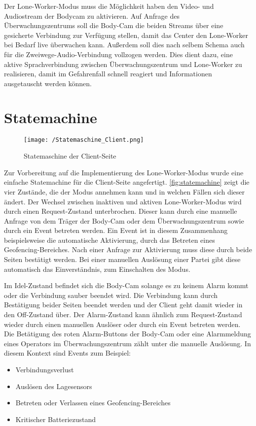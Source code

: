 \documentclass[thesis.tex]{subfiles}
\begin{document}
Der Lone-Worker-Modus muss die Möglichkeit haben den Video- und Audiostream der Bodycam zu aktivieren.
Auf Anfrage des Überwachungszentrums soll die Body-Cam die beiden Streams über eine gesicherte Verbindung zur Verfügung stellen,
damit das Center den Lone-Worker bei Bedarf live überwachen kann.
Außerdem soll dies nach selbem Schema auch für die Zweiwege-Audio-Verbindung vollzogen werden.
Dies dient dazu, eine aktive Sprachverbindung zwischen Überwachungszentrum und Lone-Worker zu realisieren, damit im Gefahrenfall schnell reagiert
und Informationen ausgetauscht werden können.

\pagebreak

\section{Statemachine}

\begin{figure}[h]
    \centering
    \texttt{[image: /Statemaschine\_Client.png]}
    \caption{Statemaschine der Client-Seite}
    \label{fig:statemachine}
\end{figure}

Zur Vorbereitung auf die Implementierung des Lone-Worker-Modus wurde eine einfache Statemachine für die Client-Seite angefertigt.
\autoref{fig:statemachine} zeigt die vier Zustände, die der Modus annehmen kann und in welchen Fällen sich dieser ändert.
Der Wechsel zwischen inaktiven und aktiven Lone-Worker-Modus wird durch einen Request-Zustand unterbrochen.
Dieser kann durch eine manuelle Anfrage von dem Träger der Body-Cam oder dem Überwachungszentrum sowie durch ein Event betreten werden.
Ein Event ist in diesem Zusammenhang beispielsweise die automatische Aktivierung, durch das Betreten eines Geofencing-Bereiches.
Nach einer Anfrage zur Aktivierung muss diese durch beide Seiten bestätigt werden.
Bei einer manuellen Auslösung einer Partei gibt diese automatisch das Einverständnis, zum Einschalten des Modus.

Im Idel-Zustand befindet sich die Body-Cam solange es zu keinem Alarm kommt oder die Verbindung sauber beendet wird.
Die Verbindung kann durch Bestätigung beider Seiten beendet werden und der Client geht damit wieder in den Off-Zustand über.
Der Alarm-Zustand kann ähnlich zum Request-Zustand wieder durch einen manuellen Auslöser oder durch ein Event betreten werden.
Die Betätigung des roten Alarm-Buttons der Body-Cam oder eine Alarmmeldung eines Operators im Überwachungszentrum zählt unter die manuelle Auslösung.
In diesem Kontext sind Events zum Beispiel:
\begin{itemize}
    \item Verbindungsverlust
    \item Auslösen des Lagesensors
    \item Betreten oder Verlassen eines Geofencing-Bereiches
    \item Kritischer Batteriezustand
\end{itemize}
\end{document}

